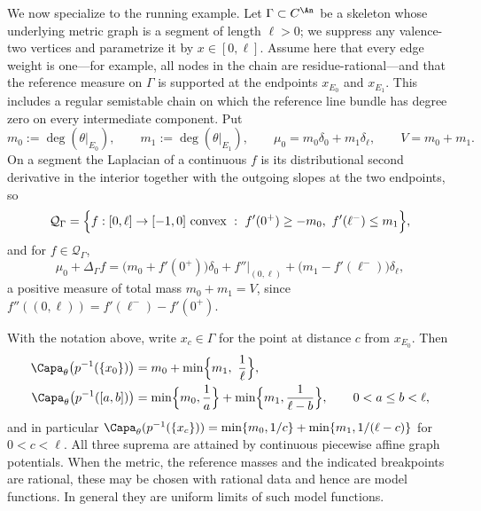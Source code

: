 We now specialize to the running example.  Let $\Gamma\subset C^{\An}$
be a skeleton whose underlying metric graph is a segment of length
$\ell>0$; we suppress any valence-two vertices and parametrize it by
$x\in[0,\ell]$.  Assume here that every edge weight is one---for example,
all nodes in the chain are residue-rational---and that the reference measure on $\Gamma$ is
supported at the endpoints $x_{E_0}$ and $x_{E_1}$.  This includes a
regular semistable chain on which the reference line bundle has degree zero
on every intermediate component.  Put
\[
 m_0:=\deg(\theta|_{E_0}),\qquad m_1:=\deg(\theta|_{E_1}),
 \qquad \mu_0=m_0\delta_0+m_1\delta_\ell,
 \qquad V=m_0+m_1 .
\]
On a segment the Laplacian of a continuous $f$ is its distributional second
derivative in the interior together with the outgoing slopes at the two
endpoints, so
\begin{equation}
\label{eq:ch25-segment-class}
 \mathcal Q_\Gamma
 =\Bigl\{f:[0,\ell]\to[-1,0]\ \text{convex}\ :\
   f'(0^+)\geq-m_0,\ f'(\ell^-)\leq m_1\Bigr\},
\end{equation}
and for $f\in\mathcal Q_\Gamma$,
\begin{equation}
\label{eq:ch25-segment-measure}
 \mu_0+\Delta_\Gamma f
 =\bigl(m_0+f'(0^+)\bigr)\delta_0
  +f''|_{(0,\ell)}
  +\bigl(m_1-f'(\ell^-)\bigr)\delta_\ell ,
\end{equation}
a positive measure of total mass $m_0+m_1=V$, since
$f''((0,\ell))=f'(\ell^-)-f'(0^+)$.

\begin{proposition}
\label{prop:ch25-segment-capacities}
With the notation above, write $x_c\in\Gamma$ for the point at distance
$c$ from $x_{E_0}$.  Then
\begin{align}
\label{eq:ch25-cap-endpoint}
 \Capa_\theta\bigl(p^{-1}(\{x_0\})\bigr)
 &=m_0+\min\Bigl\{m_1,\ \frac1\ell\Bigr\},\\
\label{eq:ch25-cap-interval}
 \Capa_\theta\bigl(p^{-1}([a,b])\bigr)
 &=\min\Bigl\{m_0,\frac1a\Bigr\}+\min\Bigl\{m_1,\frac1{\ell-b}\Bigr\},
 \qquad 0<a\leq b<\ell,
\end{align}
and in particular
$\Capa_\theta(p^{-1}(\{x_c\}))
 =\min\{m_0,1/c\}+\min\{m_1,1/(\ell-c)\}$ for $0<c<\ell$.
All three suprema are attained by continuous piecewise affine graph
potentials.  When the metric, the reference masses and the indicated
breakpoints are rational, these may be chosen with rational data and hence
are model functions.  In general they are uniform limits of such model
functions.
\end{proposition}

